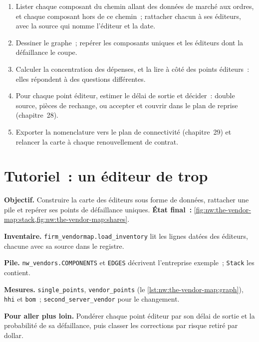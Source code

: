 \begin{method}\label{met:nw:the-vendor-map:read}
\begin{enumerate}
\item Lister chaque composant du chemin allant des données de marché aux ordres, et chaque composant hors de ce chemin~; rattacher chacun à ses éditeurs, avec la source
  qui nomme l'éditeur et la date.
\item Dessiner le graphe~; repérer les composants uniques et les éditeurs dont la défaillance le coupe.
\item Calculer la concentration des dépenses, et la lire à côté des points éditeurs~: elles répondent à des questions différentes.
\item Pour chaque point éditeur, estimer le délai de sortie et décider~: double source, pièces de rechange, ou accepter et couvrir dans le plan de reprise
  (chapitre~28).
\item Exporter la nomenclature vers le plan de connectivité (chapitre~29) et relancer la carte à chaque renouvellement de contrat.
\end{enumerate}
\end{method}

\section{Tutoriel~: un éditeur de trop}\label{tut:nw:the-vendor-map:tut}

\begin{tutorial}
\textbf{Objectif.} Construire la carte des éditeurs sous forme de données, rattacher une pile et repérer ses points de défaillance uniques.
\textbf{État final~:} \cref{fig:nw:the-vendor-map:stack,fig:nw:the-vendor-map:shares}.
\begin{tutsteps}
\item \textbf{Inventaire.} \texttt{firm\_vendormap.load\_inventory} lit les lignes datées des éditeurs, chacune avec sa source dans le registre.
\item \textbf{Pile.} \texttt{nw\_vendors.COMPONENTS} et \texttt{EDGES} décrivent l'entreprise exemple~; \texttt{Stack} les contient.
\item \textbf{Mesures.} \texttt{single\_points}, \texttt{vendor\_points} (le \cref{lst:nw:the-vendor-map:graph}), \texttt{hhi} et
  \texttt{bom}~; \texttt{second\_server\_vendor} pour le changement.
\end{tutsteps}
\textbf{Pour aller plus loin.} Pondérer chaque point éditeur par son délai de sortie et la probabilité de sa défaillance, puis classer les corrections par
risque retiré par dollar.
\end{tutorial}


